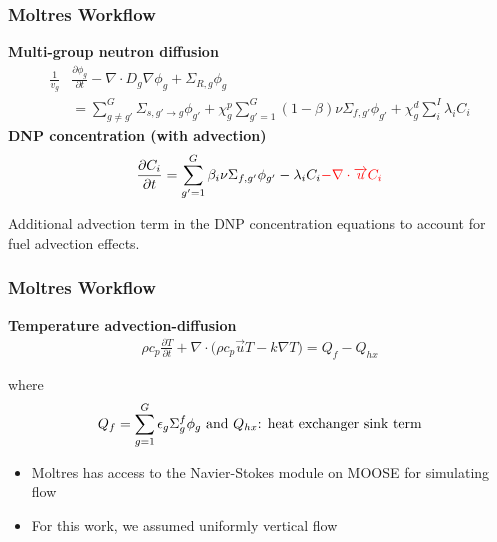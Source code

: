\begin{frame}
	\frametitle{Moltres Workflow}
	\textbf{Multi-group neutron diffusion}
		\begin{align}
	\frac{1}{v_g} &\frac{\partial \phi_g}{\partial t} - \nabla \cdot D_g \nabla
	\phi_g + \Sigma_{R,g} \phi_g \nonumber \\ 
	&= \sum^G_{g \neq g'} \Sigma_{s,g' \rightarrow g} \phi_{g'} + \chi^p_g
	\sum^G_{g'=1} (1-\beta) \nu \Sigma_{f,g'} \phi_{g'} + \chi^d_g \sum^I_i
	\lambda_i C_i \label{eq1}
		\end{align}
	\textbf{\gls{DNP} concentration (with advection)}
		\begin{align}
	\frac{\partial C_i}{\partial t} = \sum^G_{g'=1} \beta_i \nu \Sigma_{f,g'}
	\phi_{g'} - \lambda_i C_i
	{\color{red}
	 - \nabla \cdot \overrightarrow{u} C_i}
	\label{eq2}
		\end{align}
		
		Additional advection term in the \gls{DNP} concentration
		equations to account for fuel advection effects.
\end{frame}

\begin{frame}
	\frametitle{Moltres Workflow}
		\textbf{Temperature advection-diffusion}
		\begin{align}
	\rho c_{p} \frac{\partial T}{\partial t} + \nabla \cdot \big( \rho
	c_{p} \overrightarrow{u} T - k \nabla T \big) = Q_f - Q_{hx}
	\label{eq3}
		\end{align}
		
		where
		\begin{align*}
		Q_f = \sum^G_{g=1} \epsilon_g \Sigma_g^f \phi_g \hfill
		\text{ and } \hfill Q_{hx} \text{: heat exchanger sink term} \label{eq4}
		\end{align*}
		
		\begin{itemize}
			\item Moltres has access to the Navier-Stokes module on \gls{MOOSE}
			for simulating flow
			\item For this work, we assumed uniformly vertical flow
		\end{itemize}
\end{frame}

